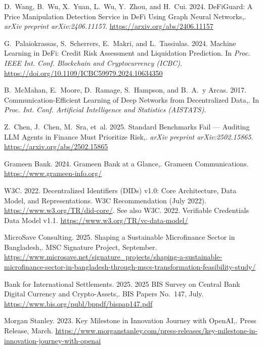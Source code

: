 {\begin{enumerate}[label={[\arabic*]}]
\item D.~Wang, B.~Wu, X.~Yuan, L.~Wu, Y.~Zhou, and H.~Cui. 2024. DeFiGuard: A Price Manipulation Detection Service in DeFi Using Graph Neural Networks,. \emph{arXiv preprint arXiv:2406.11157}. \url{https://arxiv.org/abs/2406.11157}

\item G.~Palaiokrassas, S.~Scherrers, E.~Makri, and L.~Tassiulas. 2024. Machine Learning in DeFi: Credit Risk Assessment and Liquidation Prediction. In \emph{Proc. IEEE Int. Conf. Blockchain and Cryptocurrency (ICBC)}. \url{https://doi.org/10.1109/ICBC59979.2024.10634350}

\item B.~McMahan, E.~Moore, D.~Ramage, S.~Hampson, and B.~A.~y Arcas. 2017. Communication-Efficient Learning of Deep Networks from Decentralized Data,. In \emph{Proc. Int. Conf. Artificial Intelligence and Statistics (AISTATS)}.

\item Z.~Chen, J.~Chen, M.~Sra, et~al. 2025. Standard Benchmarks Fail --- Auditing LLM Agents in Finance Must Prioritize Risk,. \emph{arXiv preprint arXiv:2502.15865}. \url{https://arxiv.org/abs/2502.15865}

\item Grameen Bank. 2024. Grameen Bank at a Glance,. Grameen Communications. \url{https://www.grameen-info.org/}

\item W3C. 2022. Decentralized Identifiers (DIDs) v1.0: Core Architecture, Data Model, and Representations. W3C Recommendation (July 2022). \url{https://www.w3.org/TR/did-core/}. See also W3C. 2022. Verifiable Credentials Data Model v1.1. \url{https://www.w3.org/TR/vc-data-model/}

\item MicroSave Consulting. 2025. Shaping a Sustainable Microfinance Sector in Bangladesh,. MSC Signature Project, September. \url{https://www.microsave.net/signature_projects/shaping-a-sustainable-microfinance-sector-in-bangladesh-through-mscs-transformation-feasibility-study/}

\item Bank for International Settlements. 2025. 2025 BIS Survey on Central Bank Digital Currency and Crypto-Assets,. BIS Papers No.~147, July. \url{https://www.bis.org/publ/bppdf/bispap147.pdf}

\item Morgan Stanley. 2023. Key Milestone in Innovation Journey with OpenAI,. Press Release, March. \url{https://www.morganstanley.com/press-releases/key-milestone-in-innovation-journey-with-openai}


\end{enumerate}}
